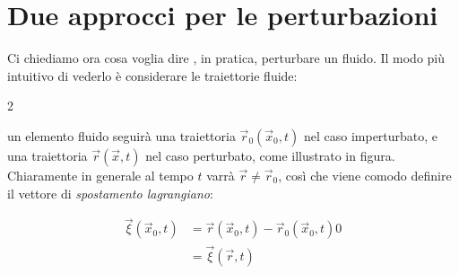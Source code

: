 \documentclass{report}
\begin{document}
\section{Due approcci per le perturbazioni}

Ci chiediamo ora cosa voglia dire , in pratica, perturbare un fluido. Il modo più intuitivo di vederlo è considerare le traiettorie fluide: 

\begin{multicols}{2}



    
\columnbreak

un elemento fluido seguirà una traiettoria $\vec{r}_0(\vec{x}_0, t)$ nel caso imperturbato, e una traiettoria $\vec{r}(\vec{x}, t)$ nel caso perturbato, come illustrato in figura. Chiaramente in generale al tempo $t$ varrà $\vec{r} \neq \vec{r}_0$, così che viene comodo definire il vettore di \emph{spostamento lagrangiano}: 

\vspace{-0.5cm}

\begin{align}
    \vec\xi(\vec{x}_0, t) &= \vec{r}(\vec{x}_0, t) - \vec{r}_0(\vec{x}_0, t)0 \\ &= \vec{\xi}(\vec{r}, t)
\end{align}

\end{multicols}
\end{document}
